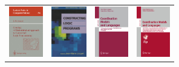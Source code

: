 \documentclass[portrait,final,a0paper]{nadiposter}
\begin{document}
\begin{poster}
{\begin{minipage}{0.65\linewidth}
\begin{itemize}
\end{itemize}
\end{minipage}
\hfill
\begin{minipage}{0.35\linewidth}
\begin{flushright}
\begin{tabular}{cccc}
\includegraphics[height=6em]{images/lncs1.jpg} &
\includegraphics[height=6em]{images/rwiley2.jpeg}&
\includegraphics[height=6em]{images/lncs2.jpg} &
\includegraphics[height=6em]{images/lncs3.jpg} 
\end{tabular}
\end{flushright}
\end{minipage}
  
}

\end{poster}
\end{document}
